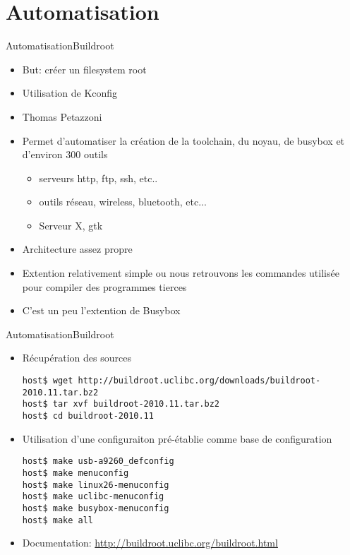 

\section{Automatisation}

\begin{frame}[fragile=singleslide]{Automatisation}{Buildroot}
  \begin{itemize}
  \item But: créer un filesystem root
  \item Utilisation de Kconfig
  \item Thomas Petazzoni
  \item Permet d'automatiser la création  de la toolchain, du noyau,
    de busybox et d'environ 300 outils
    \begin{itemize}
    \item serveurs http, ftp, ssh, etc..
    \item outils réseau, wireless, bluetooth, etc...
    \item Serveur X, gtk
    \end{itemize}
  \item Architecture assez propre
  \item Extention relativement simple ou nous retrouvons les commandes
    utilisée pour compiler des programmes tierces
  \item C'est un peu l'extention de Busybox
  \end{itemize}
\end{frame}

\begin{frame}[fragile=singleslide]{Automatisation}{Buildroot}
  \begin{itemize}
  \item Récupération des sources
    \begin{lstlisting}
host$ wget http://buildroot.uclibc.org/downloads/buildroot-2010.11.tar.bz2
host$ tar xvf buildroot-2010.11.tar.bz2
host$ cd buildroot-2010.11
    \end{lstlisting}
  \item  Utilisation  d'une configuraiton  pré-établie  comme base  de
    configuration
    \begin{lstlisting}
host$ make usb-a9260_defconfig
host$ make menuconfig
host$ make linux26-menuconfig
host$ make uclibc-menuconfig
host$ make busybox-menuconfig
host$ make all
    \end{lstlisting}
  \item Documentation: \url{http://buildroot.uclibc.org/buildroot.html}
  \end{itemize}
\end{frame}


